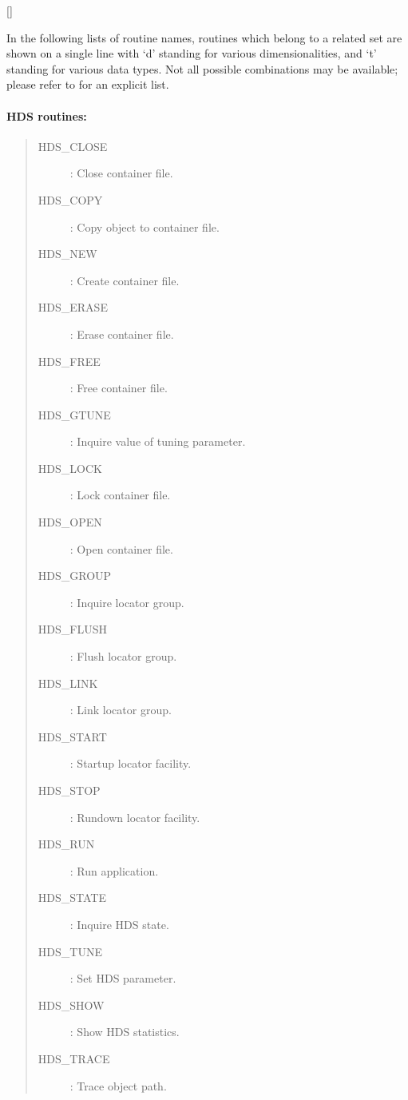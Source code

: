 \vspace{-9mm}

\hfill []

\vspace{2mm}

In the following lists of routine names, routines which belong to a related
set are shown on a single line with `d' standing for various dimensionalities,
and `t' standing for various data types.
Not all possible combinations may be available; please refer to
 for an explicit list.

\paragraph{HDS routines:}

\begin{quote}
\begin{description}
\item [HDS\_CLOSE] : Close container file.
\item [HDS\_COPY] : Copy object to container file.
\item [HDS\_NEW] : Create container file.
\item [HDS\_ERASE] : Erase container file.
\item [HDS\_FREE] : Free container file.
\item [HDS\_GTUNE] : Inquire value of tuning parameter.
\item [HDS\_LOCK] : Lock container file.
\item [HDS\_OPEN] : Open container file.
\item [HDS\_GROUP] : Inquire locator group.
\item [HDS\_FLUSH] : Flush locator group.
\item [HDS\_LINK] : Link locator group.
\item [HDS\_START] : Startup locator facility.
\item [HDS\_STOP] : Rundown locator facility.
\item [HDS\_RUN] : Run application.
\item [HDS\_STATE] : Inquire HDS state.
\item [HDS\_TUNE] : Set HDS parameter.
\item [HDS\_SHOW] : Show HDS statistics.
\item [HDS\_TRACE] : Trace object path.
\end{description}
\end{quote}

\vspace*{5mm}

